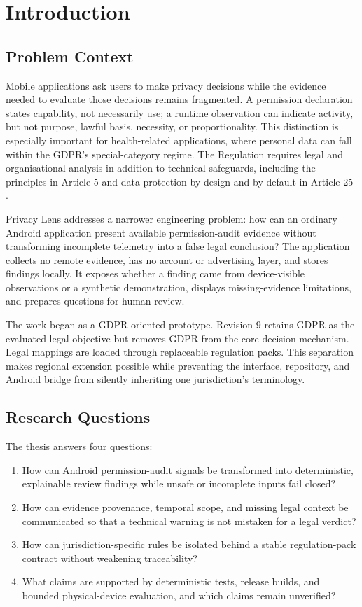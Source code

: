 \section{Introduction}

\subsection{Problem Context}

Mobile applications ask users to make privacy decisions while the evidence needed to evaluate those decisions remains fragmented. A permission declaration states capability, not necessarily use; a runtime observation can indicate activity, but not purpose, lawful basis, necessity, or proportionality. This distinction is especially important for health-related applications, where personal data can fall within the GDPR's special-category regime. The Regulation requires legal and organisational analysis in addition to technical safeguards, including the principles in Article 5 and data protection by design and by default in Article 25 \cite{eurlex2016,edpb2019}.

Privacy Lens addresses a narrower engineering problem: how can an ordinary Android application present available permission-audit evidence without transforming incomplete telemetry into a false legal conclusion? The application collects no remote evidence, has no account or advertising layer, and stores findings locally. It exposes whether a finding came from device-visible observations or a synthetic demonstration, displays missing-evidence limitations, and prepares questions for human review.

The work began as a GDPR-oriented prototype. Revision 9 retains GDPR as the evaluated legal objective but removes GDPR from the core decision mechanism. Legal mappings are loaded through replaceable regulation packs. This separation makes regional extension possible while preventing the interface, repository, and Android bridge from silently inheriting one jurisdiction's terminology.

\subsection{Research Questions}

The thesis answers four questions:

\begin{enumerate}
    \item How can Android permission-audit signals be transformed into deterministic, explainable review findings while unsafe or incomplete inputs fail closed?
    \item How can evidence provenance, temporal scope, and missing legal context be communicated so that a technical warning is not mistaken for a legal verdict?
    \item How can jurisdiction-specific rules be isolated behind a stable regulation-pack contract without weakening traceability?
    \item What claims are supported by deterministic tests, release builds, and bounded physical-device evaluation, and which claims remain unverified?
\end{enumerate}

